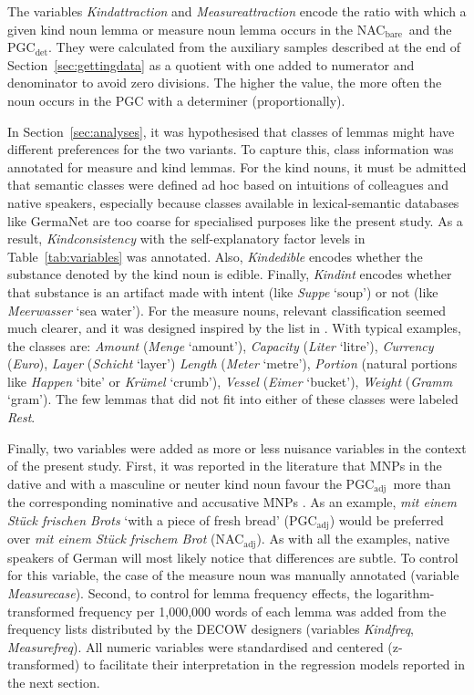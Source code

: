 \documentclass[USenglish]{article}
\newcommand{\Sub}[1]{\ensuremath{\mathrm{_{#1}}}}
\newcommand{\NACb}{NAC\Sub{bare}}
\newcommand{\NACa}{NAC\Sub{adj}}
\newcommand{\PGCd}{PGC\Sub{det}}
\newcommand{\PGCa}{PGC\Sub{adj}}
\begin{document}
The variables \textit{Kindattraction} and \textit{Measureattraction} encode the ratio with which a given kind noun lemma or measure noun lemma occurs in the \NACb\ and the \PGCd.
They were calculated from the auxiliary samples described at the end of Section~\ref{sec:gettingdata} as a quotient with one added to numerator and denominator to avoid zero divisions.
The higher the value, the more often the noun occurs in the PGC with a determiner (proportionally).

In Section~\ref{sec:analyses}, it was hypothesised that classes of lemmas might have different preferences for the two variants.
To capture this, class information was annotated for measure and kind lemmas.
For the kind nouns, it must be admitted that semantic classes were defined ad hoc based on intuitions of colleagues and native speakers, especially because classes available in lexical-semantic databases like GermaNet \citep{HampFeldweg1997} are too coarse for specialised purposes like the present study.
As a result, \textit{Kindconsistency} with the self-explanatory factor levels in Table~\ref{tab:variables} was annotated.
Also, \textit{Kindedible} encodes whether the substance denoted by the kind noun is edible.
Finally, \textit{Kindint} encodes whether that substance is an artifact made with intent (like \textit{Suppe} `soup') or not (like \textit{Meerwasser} `sea water').
For the measure nouns, relevant classification seemed much clearer, and it was designed inspired by the list in \cite[530]{Koptjevskaja2001}.
With typical examples, the classes are:
\textit{Amount} (\textit{Menge} `amount'), 
\textit{Capacity} (\textit{Liter} `litre'), 
\textit{Currency} (\textit{Euro}), 
\textit{Layer} (\textit{Schicht} `layer')
\textit{Length} (\textit{Meter} `metre'), 
\textit{Portion} (natural portions like \textit{Happen} `bite' or \textit{Krümel} `crumb'), 
\textit{Vessel} (\textit{Eimer} `bucket'), 
\textit{Weight} (\textit{Gramm} `gram').
The few lemmas that did not fit into either of these classes were labeled \textit{Rest}.

Finally, two variables were added as more or less nuisance variables in the context of the present study.
First, it was reported in the literature that MNPs in the dative and with a masculine or neuter kind noun favour the \PGCa\ more than the corresponding nominative and accusative MNPs \citep{Hentschel1993,Zimmer2015}.
As an example, \textit{mit einem Stück frischen Brots} `with a piece of fresh bread' (\PGCa) would be preferred over \textit{mit einem Stück frischem Brot} (\NACa).
As with all the examples, native speakers of German will most likely notice that differences are subtle.
To control for this variable, the case of the measure noun was manually annotated (variable \textit{Measurecase}).
Second, to control for lemma frequency effects, the logarithm-transformed frequency per 1,000,000 words of each lemma was added from the frequency lists distributed by the DECOW designers (variables \textit{Kindfreq}, \textit{Measurefreq}).
All numeric variables were standardised and centered (z-transformed) to facilitate their interpretation in the regression models reported 
in the next section.
\end{document}
